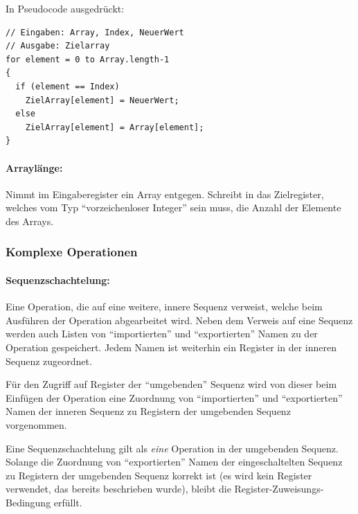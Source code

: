 \documentclass[twoside,a4paper,fleqn,12pt]{book}
\begin{document}
In Pseudocode ausgedrückt:
\begin{lstlisting}
// Eingaben: Array, Index, NeuerWert
// Ausgabe: Zielarray
for element = 0 to Array.length-1
{
  if (element == Index)
    ZielArray[element] = NeuerWert;
  else
    ZielArray[element] = Array[element];
}
\end{lstlisting}



\paragraph{Arraylänge:} Nimmt im Eingaberegister ein Array entgegen. Schreibt in das Zielregister, welches vom Typ "`vorzeichenloser Integer"' sein muss,
die Anzahl der Elemente des Arrays.


\subsubsection{Komplexe Operationen}

\paragraph{Sequenzschachtelung:} Eine Operation, die auf eine weitere, innere Sequenz verweist, welche beim Ausführen der Operation abgearbeitet wird.
Neben dem Verweis auf eine Sequenz werden auch Listen von "`importierten"' und "`exportierten"' Namen zu der Operation gespeichert.
Jedem Namen ist weiterhin ein Register in der inneren Sequenz zugeordnet.

Für den Zugriff auf Register der "`umgebenden"' Sequenz wird von dieser 
beim Einfügen der Operation eine Zuordnung von "`importierten"' und "`exportierten"' Namen der
inneren Sequenz zu Registern der umgebenden Sequenz vorgenommen. 

Eine Sequenzschachtelung gilt als \emph{eine} Operation in der umgebenden Sequenz. Solange die Zuordnung von "`exportierten"' Namen der
eingeschaltelten Sequenz zu Registern der umgebenden Sequenz korrekt ist (es wird kein Register verwendet, das bereits beschrieben wurde), bleibt die Register-Zuweisungs-Bedingung erfüllt.
\end{document}
